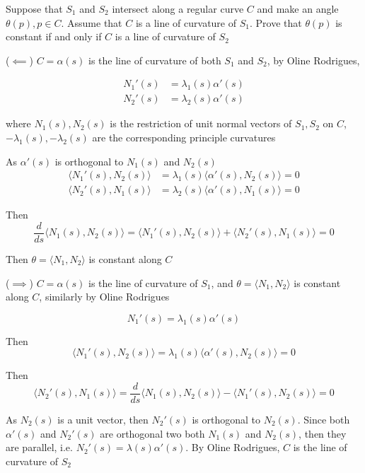 \documentclass{article}
\begin{document}
\begin{problem}
    Suppose that $S_1$ and $S_2$ intersect along a regular curve $C$ and make an angle $\theta(p), p \in C$. Assume that $C$ is a line of curvature of $S_1$. Prove that $\theta(p)$ is constant if and only if $C$ is a line of curvature of $S_2$
\end{problem}

($\impliedby$)
$C = \alpha(s)$ is the line of curvature of both $S_1$ and $S_2$, by Oline Rodrigues, 

\begin{align*}
    N_1'(s) &= \lambda_1(s) \alpha'(s) \\
    N_2'(s) &= \lambda_2(s) \alpha'(s)
\end{align*}

where $N_1(s), N_2(s)$ is the restriction of unit normal vectors of $S_1, S_2$ on $C$, $-\lambda_1(s), -\lambda_2(s)$ are the corresponding principle curvatures

As $\alpha'(s)$ is orthogonal to $N_1(s)$ and $N_2(s)$
\begin{align*}
    \langle N_1'(s), N_2(s) \rangle &= \lambda_1(s) \langle \alpha'(s), N_2(s)\rangle = 0 \\
    \langle N_2'(s), N_1(s) \rangle &= \lambda_2(s) \langle \alpha'(s), N_1(s)\rangle = 0
\end{align*}

Then
\[
    \frac{d}{ds} \langle N_1(s), N_2(s) \rangle = \langle N_1'(s), N_2(s) \rangle + \langle N_2'(s), N_1(s) \rangle = 0
\]

Then $\theta = \langle N_1, N_2 \rangle$ is constant along $C$

($\implies$) $C = \alpha(s)$ is the line of curvature of $S_1$, and $\theta = \langle N_1, N_2 \rangle$ is constant along $C$, similarly by Oline Rodrigues

\[
    N_1'(s) = \lambda_1(s) \alpha'(s)
\]

Then
\[
    \langle N_1'(s), N_2(s) \rangle = \lambda_1(s) \langle \alpha'(s), N_2(s)\rangle = 0
\]

Then 
\[
    \langle N_2'(s), N_1(s) \rangle = \frac{d}{ds} \langle N_1(s), N_2(s) \rangle - \langle N_1'(s), N_2(s) \rangle = 0
\]

As $N_2(s)$ is a unit vector, then $N_2'(s)$ is orthogonal to $N_2(s)$. Since both $\alpha'(s)$ and $N_2'(s)$ are orthogonal two both $N_1(s)$ and $N_2(s)$, then they are parallel, i.e. $N_2'(s) = \lambda(s) \alpha'(s)$. By Oline Rodrigues, $C$ is the line of curvature of $S_2$
\end{document}
